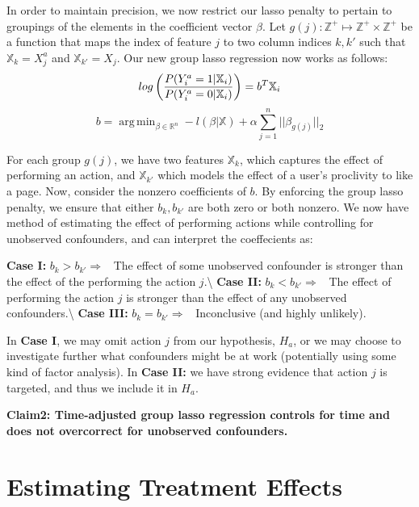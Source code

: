 \documentclass[]{article}
\DeclareMathOperator*{\argmin}{arg\,min}
\begin{document}
In order to maintain precision, we now restrict our lasso penalty to
pertain to groupings of the elements in the coefficient vector
\(\beta\). Let
\(g(j): \mathbb{Z^+} \mapsto \mathbb{Z^+} \times \mathbb{Z^+}\) be a
function that maps the index of feature \(j\) to two column indices
\(k, k'\) such that \(\mathbb{X}_k = X^a_j\) and
\(\mathbb{X}_{k'} = X_j\). Our new group lasso regression now works as
follows: \begin{equation}
log \left( \frac{P(Y^a_i = 1 | \mathbb{X}_i)}{P(Y^a_i = 0 | \mathbb{X}_i)} \right) = b^T \mathbb{X}_i\\
\end{equation} \begin{equation}
b = \argmin_{\beta \in \mathbb{R}^{n}} - l(\beta | \mathbb{X}) + \alpha \sum_{j=1}^{n}{||\beta_{g(j)}||_2}
\end{equation}

For each group \(g(j)\), we have two features \(\mathbb{X}_k\), which
captures the effect of performing an action, and \(\mathbb{X}_{k'}\)
which models the effect of a user's proclivity to like a page. Now,
consider the nonzero coefficients of \(b\). By enforcing the group lasso
penalty, we ensure that either \(b_k, b_{k'}\) are both zero or both
nonzero. We now have method of estimating the effect of performing
actions while controlling for unobserved confounders, and can interpret
the coeffecients as:

\textbf{Case I:} \(b_k > b_{k'} \Rightarrow\) ~The effect of some
unobserved confounder is stronger than the effect of the performing the
action \(j\).\textbackslash{} \textbf{Case II:}
\(b_k < b_{k'} \Rightarrow\) ~The effect of performing the action \(j\)
is stronger than the effect of any unobserved
confounders.\textbackslash{} \textbf{Case III:}
\(b_k = b_{k'} \Rightarrow\) ~Inconclusive (and highly unlikely).

In \textbf{Case I}, we may omit action \(j\) from our hypothesis,
\(H_a\), or we may choose to investigate further what confounders might
be at work (potentially using some kind of factor analysis). In
\textbf{Case II:} we have strong evidence that action \(j\) is targeted,
and thus we include it in \(H_a\).

\textbf{Claim2: Time-adjusted group lasso regression controls for time and does not overcorrect for unobserved confounders.}

\hypertarget{testing}{%
\section{Estimating Treatment Effects}\label{testing}}
\end{document}
